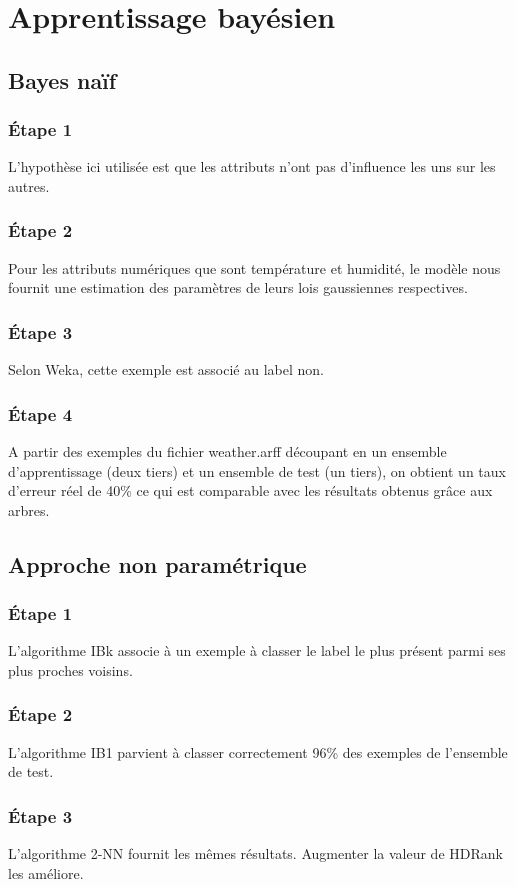 \documentclass[a4paper,12pt]{article}
\begin{document}
\section{Apprentissage bayésien}


\subsection{Bayes naïf}

\subsubsection*{\'Etape 1}
L'hypothèse ici utilisée est que les attributs n'ont pas d'influence les uns sur les autres.

\subsubsection*{\'Etape 2}
Pour les attributs numériques que sont température et humidité, le modèle nous fournit une estimation des paramètres de leurs lois gaussiennes respectives.

\subsubsection*{\'Etape 3}
Selon Weka, cette exemple est associé au label non.

\subsubsection*{\'Etape 4}
A partir des exemples du fichier weather.arff découpant en un ensemble d'apprentissage (deux tiers) et un ensemble de test (un tiers), on obtient un taux d'erreur réel de 40\% ce qui est comparable avec les résultats obtenus grâce aux arbres.

\subsection{Approche non paramétrique}

\subsubsection*{\'Etape 1}
L'algorithme IBk associe à un exemple à classer le label le plus présent parmi ses plus proches voisins.

\subsubsection*{\'Etape 2}
L'algorithme IB1 parvient à classer correctement 96\% des exemples de l'ensemble de test.

\subsubsection*{\'Etape 3}
L'algorithme 2-NN fournit les mêmes résultats. Augmenter la valeur de HDRank les améliore.

\end{document}
